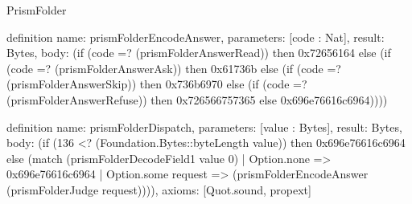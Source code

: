 \begin{lexlean}{PrismFolder}
\begin{semanticmodule}
definition{
  name: prismFolderEncodeAnswer,
  parameters: [code : Nat],
  result: Bytes,
  body: (if (code =? (prismFolderAnswerRead)) then 0x72656164 else (if (code =? (prismFolderAnswerAsk)) then 0x61736b else (if (code =? (prismFolderAnswerSkip)) then 0x736b6970 else (if (code =? (prismFolderAnswerRefuse)) then 0x726566757365 else 0x696e76616c6964))))
}

definition{
  name: prismFolderDispatch,
  parameters: [value : Bytes],
  result: Bytes,
  body: (if (136 <? (Foundation.Bytes::byteLength value)) then 0x696e76616c6964 else (match (prismFolderDecodeField1 value 0)
    | Option.none => 0x696e76616c6964
    | Option.some request => (prismFolderEncodeAnswer (prismFolderJudge request)))),
  axioms: [Quot.sound, propext]
}
\end{semanticmodule}
\end{lexlean}
